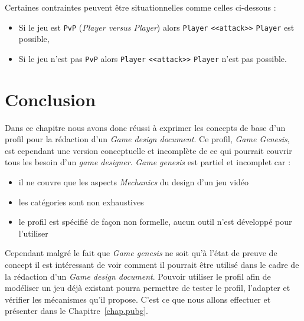 
Certaines contraintes peuvent être situationnelles comme celles ci-dessous :
\begin{itemize}
    \item Si le jeu est \texttt{PvP} (\emph{Player versus Player}) alors \texttt{Player} \texttt{<<attack>>} \texttt{Player} est possible,
    \item Si le jeu n'est pas \texttt{PvP} alors \texttt{Player} \texttt{<<attack>>} \texttt{Player} n'est pas possible.
\end{itemize}



\section{Conclusion}
Dans ce chapitre nous avons donc réussi à exprimer les concepts de base d'un profil pour la rédaction d'un \emph{Game design document}.
Ce profil, \emph{Game Genesis}, est cependant une version conceptuelle et incomplète de ce qui pourrait couvrir tous les besoin d'un \emph{game designer}.
\emph{Game genesis} est partiel et incomplet car :
\begin{itemize}
    \item il ne couvre que les aspects \emph{Mechanics} du design d'un jeu vidéo
    \item les catégories sont non exhaustives
    \item le profil est spécifié de façon non formelle, aucun outil n'est développé pour l'utiliser
\end{itemize}

Cependant malgré le fait que \emph{Game genesis} ne soit qu'à l'état de preuve de concept il est intéressant de voir comment il pourrait être utilisé dans le cadre de la rédaction d'un \emph{Game design document}.
Pouvoir utiliser le profil afin de modéliser un jeu déjà existant pourra permettre de tester le profil, l'adapter et vérifier les mécanismes qu'il propose.
C'est ce que nous allons effectuer et présenter dans le Chapitre~\ref{chap.pubg}.




